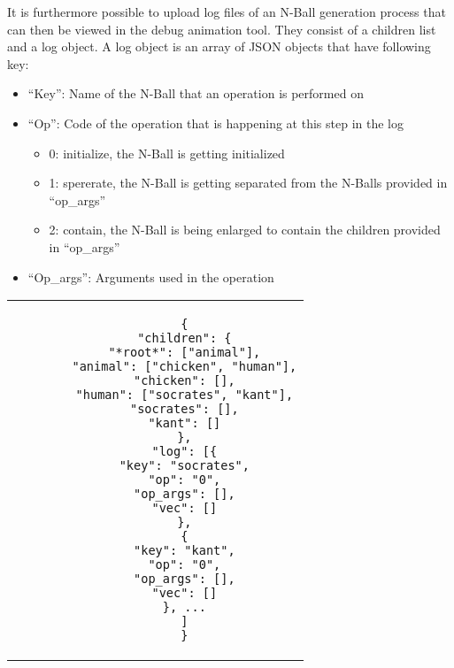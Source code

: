 It is furthermore possible to upload log files of an N-Ball generation process that can then be viewed in the debug animation tool. They consist of a children list and a log object. A log object is an array of JSON objects that have following key:
\begin{itemize}
	\item “Key”: Name of the N-Ball that an operation is performed on
	\item “Op”: Code of the operation that is happening at this step in the log
	\begin{itemize}
		\item 0: initialize, the N-Ball is getting initialized 
		\item 1: spererate, the N-Ball is getting separated from the N-Balls provided in “op\_args”
		\item 2: contain, the N-Ball is being enlarged to contain the children provided in “op\_args”
	\end{itemize}
	\item “Op\_args”: Arguments used in the operation
\end{itemize}
\begin{center}
	\begin{tabular}{c}
		\begin{lstlisting}
		{
		"children": {
		"*root*": ["animal"],
		"animal": ["chicken", "human"],
		"chicken": [],
		"human": ["socrates", "kant"],
		"socrates": [],
		"kant": []
		},
		"log": [{
		"key": "socrates",
		"op": "0",
		"op_args": [],
		"vec": []
		},
		{
		"key": "kant",
		"op": "0",
		"op_args": [],
		"vec": []
		}, ...
		]
		}
		\end{lstlisting}
	\end{tabular}
\end{center}